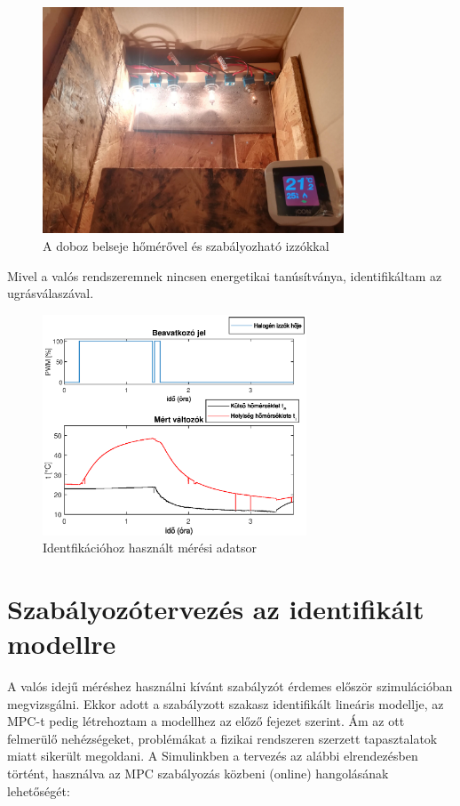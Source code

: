 \begin{figure}[H]
	\centering
	\includegraphics[width=0.8\textwidth]{figures/realsys/interior2}
	\caption{A doboz belseje hőmérővel és szabályozható izzókkal}
	\label{fig:realsys-interior}
\end{figure}

Mivel a valós rendszeremnek nincsen energetikai tanúsítványa, identifikáltam az ugrásválaszával.

\begin{figure}[H]
	\centering
	\includegraphics[width=0.7\textwidth]{figures/realsys/ident}
	\caption{Identfikációhoz használt mérési adatsor}
	\label{fig:realsys-ident}
\end{figure}

\section{Szabályozótervezés az identifikált modellre}

A valós idejű méréshez használni kívánt szabályzót érdemes először szimulációban megvizsgálni. Ekkor adott a szabályzott szakasz identifikált lineáris modellje, az MPC-t pedig létrehoztam  a modellhez az előző fejezet szerint. Ám az ott felmerülő nehézségeket, problémákat a fizikai rendszeren szerzett tapasztalatok miatt sikerült megoldani. A Simulinkben a tervezés az alábbi elrendezésben történt, használva az MPC szabályozás közbeni (online) hangolásának lehetőségét:

